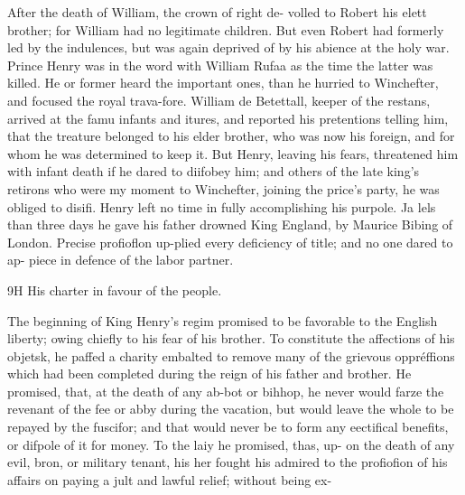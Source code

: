 \documentclass{article}
\begin{document}
After the death of William, the crown of right de- volled to Robert his elett brother; for William had no legitimate children. But even Robert had formerly led by the indulences, but was again deprived of by his abience at the holy war. Prince Henry was in the word with William Rufaa as the time the latter was killed. He or former heard the important ones, than he hurried to Winchefter, and focused the royal trava-fore. William de Betettall, keeper of the restans, arrived at the famu infants and itures, and reported his pretentions telling him, that the treature belonged to his elder brother, who was now his foreign, and for whom he was determined to keep it. But Henry, leaving his fears, threatened him with infant death if he dared to diifobey him; and others of the late king’s retirons who were my moment to Winchefter, joining the price’s party, he was obliged to disifi. Henry left no time in fully accomplishing his purpole. Ja lels than three days he gave his father drowned King England, by Maurice Bibing of London. Precise profioflon up-plied every deficiency of title; and no one dared to ap- piece in defence of the labor partner.

9H His charter in favour of the people.

The beginning of King Henry's regim promised to be favorable to the English liberty; owing chiefly to his fear of his brother. To constitute the affections of his objetsk, he paffed a charity embalted to remove many of the grievous oppréffions which had been completed during the reign of his father and brother. He promised, that, at the death of any ab-bot or bihhop, he never would farze the revenant of the fee or abby during the vacation, but would leave the whole to be repayed by the fuscifor; and that would never be to form any eectifical benefits, or difpole of it for money. To the laiy he promised, thas, up- on the death of any evil, bron, or military tenant, his her fought his admired to the profiofion of his affairs on paying a jult and lawful relief; without being ex-
\end{document}
